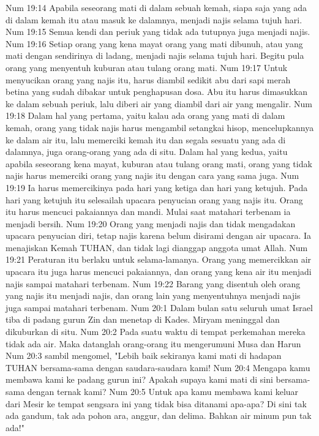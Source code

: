 Num 19:14  Apabila seseorang mati di dalam sebuah kemah, siapa saja yang ada di dalam kemah itu atau masuk ke dalamnya, menjadi najis selama tujuh hari.
Num 19:15  Semua kendi dan periuk yang tidak ada tutupnya juga menjadi najis.
Num 19:16  Setiap orang yang kena mayat orang yang mati dibunuh, atau yang mati dengan sendirinya di ladang, menjadi najis selama tujuh hari. Begitu pula orang yang menyentuh kuburan atau tulang orang mati.
Num 19:17  Untuk menyucikan orang yang najis itu, harus diambil sedikit abu dari sapi merah betina yang sudah dibakar untuk penghapusan dosa. Abu itu harus dimasukkan ke dalam sebuah periuk, lalu diberi air yang diambil dari air yang mengalir.
Num 19:18  Dalam hal yang pertama, yaitu kalau ada orang yang mati di dalam kemah, orang yang tidak najis harus mengambil setangkai hisop, mencelupkannya ke dalam air itu, lalu memerciki kemah itu dan segala sesuatu yang ada di dalamnya, juga orang-orang yang ada di situ. Dalam hal yang kedua, yaitu apabila seseorang kena mayat, kuburan atau tulang orang mati, orang yang tidak najis harus memerciki orang yang najis itu dengan cara yang sama juga.
Num 19:19  Ia harus memercikinya pada hari yang ketiga dan hari yang ketujuh. Pada hari yang ketujuh itu selesailah upacara penyucian orang yang najis itu. Orang itu harus mencuci pakaiannya dan mandi. Mulai saat matahari terbenam ia menjadi bersih.
Num 19:20  Orang yang menjadi najis dan tidak mengadakan upacara penyucian diri, tetap najis karena belum disirami dengan air upacara. Ia menajiskan Kemah TUHAN, dan tidak lagi dianggap anggota umat Allah.
Num 19:21  Peraturan itu berlaku untuk selama-lamanya. Orang yang memercikkan air upacara itu juga harus mencuci pakaiannya, dan orang yang kena air itu menjadi najis sampai matahari terbenam.
Num 19:22  Barang yang disentuh oleh orang yang najis itu menjadi najis, dan orang lain yang menyentuhnya menjadi najis juga sampai matahari terbenam.
Num 20:1  Dalam bulan satu seluruh umat Israel tiba di padang gurun Zin dan menetap di Kades. Miryam meninggal dan dikuburkan di situ.
Num 20:2  Pada suatu waktu di tempat perkemahan mereka tidak ada air. Maka datanglah orang-orang itu mengerumuni Musa dan Harun
Num 20:3  sambil mengomel, "Lebih baik sekiranya kami mati di hadapan TUHAN bersama-sama dengan saudara-saudara kami!
Num 20:4  Mengapa kamu membawa kami ke padang gurun ini? Apakah supaya kami mati di sini bersama-sama dengan ternak kami?
Num 20:5  Untuk apa kamu membawa kami keluar dari Mesir ke tempat sengsara ini yang tidak bisa ditanami apa-apa? Di sini tak ada gandum, tak ada pohon ara, anggur, dan delima. Bahkan air minum pun tak ada!"

